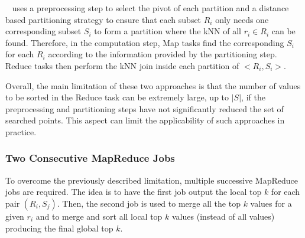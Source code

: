 \noindent \VO~ \cite{Lu:2012:EPK:2336664.2336674} uses a preprocessing step to select the pivot of each partition and a distance based partitioning 
strategy to ensure that each subset $R_i$ only needs one corresponding subset $S_i$ to form a partition where the kNN of all $r_i \in R_i$ can 
be found. Therefore, in the computation step, Map tasks find the corresponding $S_i$ for each $R_i$ according to the information provided by 
the partitioning step. Reduce tasks then perform the kNN join inside each partition of $<R_i, S_i>$.



Overall, the main limitation of these two approaches is that the number of values to be sorted in the Reduce task
can be extremely large, up to $\left|S\right|$, if the
preprocessing and partitioning steps have not significantly reduced the set of searched points.
This aspect can limit the applicability of such approaches in practice. 


\subsubsection{Two Consecutive MapReduce Jobs}
To overcome the previously described limitation, multiple successive MapReduce jobs are required. The idea is to have the first job output the local top $k$ for each pair $(R_i, S_j)$. Then, the second job is used to merge all the top $k$ values for a given $r_i$ and to merge and sort all local top $k$ values (instead of all values) producing the final global top $k$.

